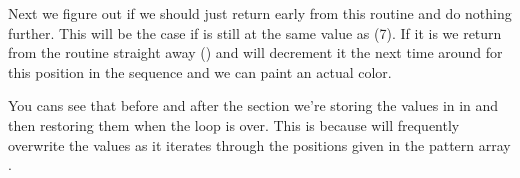 Next we figure out if we should just return early from this routine and do nothing further. This will be the
case if  is still at the same value as  (7). If it is
we return from the routine straight away () and
 will decrement it the next time around for this position
in the sequence and we can paint an actual color.

You cans see that before and after the  section we're storing the values in  in
 and then restoring them when the loop is over. This is because 
will frequently overwrite the values as it iterates through the positions given in the pattern array .

\vspace{2cm}

